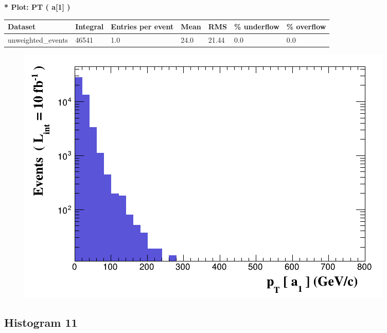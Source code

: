 \documentclass[a4paper, 10pt]{article}
\begin{document}
\textbf{* Plot: PT ( a[1] ) }\\
   \begin{table}[H]
  \begin{center}
    \begin{tabular}{|m{23.0mm}|m{23.0mm}|m{18.0mm}|m{19.0mm}|m{19.0mm}|m{19.0mm}|m{19.0mm}|}
      \hline
      {\cellcolor{yellow}         Dataset}& {\cellcolor{yellow}         Integral}& {\cellcolor{yellow}         Entries per event}& {\cellcolor{yellow}         Mean}& {\cellcolor{yellow}         RMS}& {\cellcolor{yellow}         \% underflow}& {\cellcolor{yellow}         \% overflow}\\
      \hline
      {\cellcolor{white}         unweighted\_events}& {\cellcolor{white}         46541}& {\cellcolor{white}         1.0}& {\cellcolor{white}         24.0}& {\cellcolor{white}         21.44}& {\cellcolor{green}         0.0}& {\cellcolor{green}         0.0}\\
\hline
    \end{tabular}
  \end{center}
\end{table}

\begin{figure}[H]
  \begin{center}
    \includegraphics[scale=0.45]{selection_9.png}\\
\caption{   }
  \end{center}
\end{figure}
      \newpage
\subsection{ Histogram 11}
\end{document}
